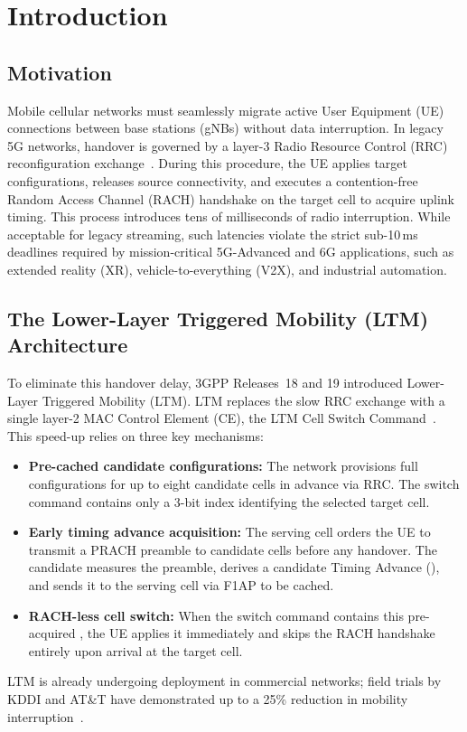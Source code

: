 \chapter{Introduction}
\label{ch:intro}

\section{Motivation}

Mobile cellular networks must seamlessly migrate active User Equipment (UE) connections between base
stations (gNBs) without data interruption. In legacy 5G networks, handover is governed by a layer-3
Radio Resource Control (RRC) reconfiguration exchange~\cite{3gpp38300}. During this procedure, the UE
applies target configurations, releases source connectivity, and executes a contention-free Random
Access Channel (RACH) handshake on the target cell to acquire uplink timing. This process introduces
tens of milliseconds of radio interruption. While acceptable for legacy streaming, such latencies
violate the strict sub-10\,ms deadlines required by mission-critical 5G-Advanced and 6G applications,
such as extended reality (XR), vehicle-to-everything (V2X), and industrial automation.

\section{The Lower-Layer Triggered Mobility (LTM) Architecture}

To eliminate this handover delay, 3GPP Releases~18 and 19 introduced Lower-Layer Triggered
Mobility (LTM). LTM replaces the slow RRC exchange with a single layer-2 MAC Control Element (CE), the
LTM Cell Switch Command~\cite{3gpp38321}. This speed-up relies on three key mechanisms:
\begin{itemize}\itemsep2pt
  \item \textbf{Pre-cached candidate configurations:} The network provisions full configurations for
        up to eight candidate cells in advance via RRC. The switch command contains only a 3-bit index
        identifying the selected target cell.
  \item \textbf{Early timing advance acquisition:} The serving cell orders the UE to transmit a PRACH
        preamble to candidate cells before any handover. The candidate measures the preamble,
        derives a candidate Timing Advance (\TA{}), and sends it to the serving cell via F1AP to be
        cached.
  \item \textbf{RACH-less cell switch:} When the switch command contains this pre-acquired \TA{}, the
        UE applies it immediately and skips the RACH handshake entirely upon arrival at the target cell.
\end{itemize}
LTM is already undergoing deployment in commercial networks; field trials by KDDI and AT\&T have
demonstrated up to a 25\% reduction in mobility interruption~\cite{ericsson2025ltmreview,ericsson2026kddi,ericsson2026att}.

